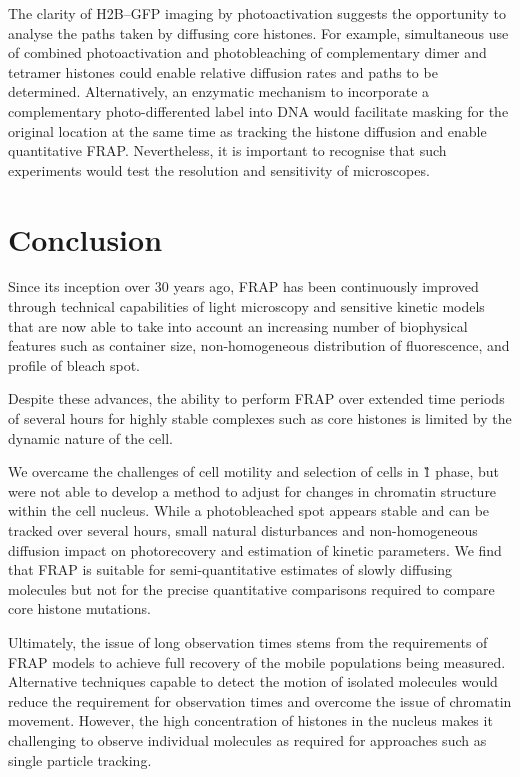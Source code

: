     The clarity of H2B--GFP imaging by photoactivation
    suggests the opportunity to analyse the
    paths taken by diffusing core histones.
    For example, simultaneous use of combined
    photoactivation and photobleaching
    of complementary dimer and tetramer histones could
    enable relative diffusion rates and paths to be determined.
    Alternatively, an enzymatic mechanism to incorporate a
    complementary photo-differented label
    into DNA  would facilitate masking for
    the original location at the same time as tracking the histone diffusion
    and enable quantitative FRAP.
    Nevertheless, it is important to recognise
    that such experiments would test the
    resolution and sensitivity of microscopes.

\section{Conclusion}

    Since its inception over 30 years ago, FRAP has been continuously
    improved
    through technical capabilities of light microscopy
    and sensitive kinetic models that are now able to take into account
    an increasing number of biophysical features such as container size,
    non-homogeneous distribution of fluorescence, and profile of bleach spot.

    Despite these advances, the ability to perform FRAP
    over extended time periods of several hours for highly stable complexes
    such as core histones is limited by the dynamic nature of the cell.

    We overcame the challenges of cell motility
    and selection of cells in \G1{} phase,
    but were not able to develop a method to adjust
    for changes in chromatin structure within the cell nucleus.
    While a photobleached spot appears stable and
    can be tracked over several hours,
    small natural disturbances and non-homogeneous diffusion
    impact on photorecovery
    and estimation of kinetic parameters.
    We find that FRAP is suitable for semi-quantitative
    estimates of slowly diffusing molecules
    but not for the precise quantitative comparisons
    required to compare core histone mutations.

    Ultimately, the issue of long observation times stems from the
    requirements of FRAP models to achieve full recovery of the mobile
    populations being measured.  Alternative techniques capable to
    detect the motion of isolated molecules would reduce the
    requirement for observation times and overcome the issue of
    chromatin movement.  However, the high concentration of histones
    in the nucleus makes it challenging to observe individual
    molecules as required for approaches such as single particle
    tracking.


